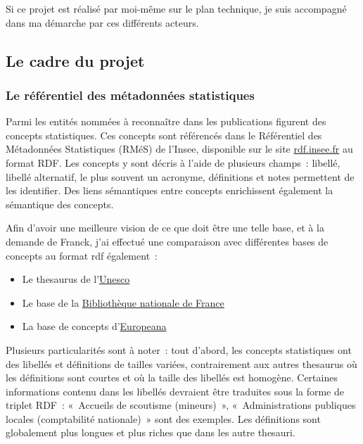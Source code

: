 Si ce projet est réalisé par moi-même sur le plan technique, je suis accompagné dans ma démarche par ces différents acteurs.
\label{section 1.1.2}

\subsection{Le cadre du projet}

\subsubsection{Le référentiel des métadonnées statistiques}
Parmi les entités nommées à reconnaître dans les publications figurent des concepts statistiques. Ces concepts sont référencés dans le Référentiel des Métadonnées Statistiques (RMéS) de l'Insee, disponible sur le site \href{http://rdf.insee.fr/sparql}{rdf.insee.fr} \cite{rdf.insee.fr} au format RDF. Les concepts y sont décris à l'aide de plusieurs champs~: libellé, libellé alternatif, le plus souvent un acronyme, définitions et notes permettent de les identifier. Des liens sémantiques entre concepts enrichissent également la sémantique des concepts.
\newline

Afin d'avoir une meilleure vision de ce que doit être une telle base, et à la demande de Franck, j'ai effectué une comparaison avec différentes bases de concepts au format rdf également~: 
\begin{itemize}
    \item Le thesaurus de l'\href{http://vocabularies.unesco.org/browser/thesaurus/en/?clang=fr}{Unesco} \cite{unesco}
    \item Le base de la \href{https://data.bnf.fr/current/sparql.html}{Bibliothèque nationale de France} \cite{bnf}
    \item La base de concepts d'\href{https://pro.europeana.eu/page/linked-open-data}{Europeana} \cite{europeana-rdf}
    \newline
\end{itemize}

Plusieurs particularités sont à noter~: tout d'abord, les concepts statistiques ont des libellés et définitions de tailles variées, contrairement aux autres thesaurus où les définitions sont courtes et où la taille des libellés est homogène. Certaines informations contenu dans les libellés devraient être traduites sous la forme de triplet RDF~: «~Accueils de scoutisme (mineurs)~», «~Administrations publiques locales (comptabilité nationale)~» sont des exemples. Les définitions sont globalement plus longues et plus riches que dans les autre thesauri.

